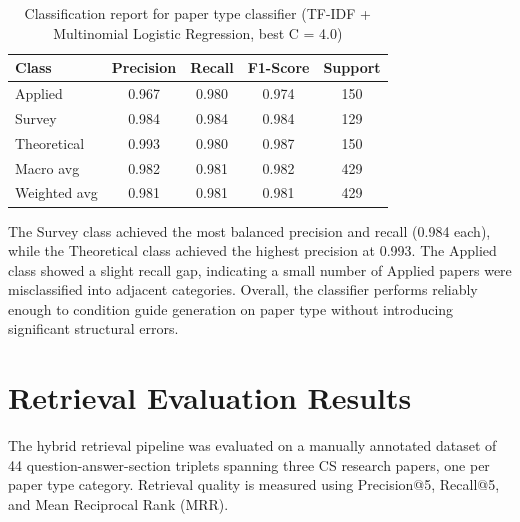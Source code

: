 \documentclass[12pt,a4paper]{report}
\begin{document}
\begin{table}[h]
\centering
\begin{tabular}{lcccc}
\toprule
\textbf{Class} & \textbf{Precision} & \textbf{Recall} & \textbf{F1-Score}
& \textbf{Support} \\
\midrule
Applied      & 0.967 & 0.980 & 0.974 & 150 \\
Survey       & 0.984 & 0.984 & 0.984 & 129 \\
Theoretical  & 0.993 & 0.980 & 0.987 & 150 \\
\midrule
Macro avg    & 0.982 & 0.981 & 0.982 & 429 \\
Weighted avg & 0.981 & 0.981 & 0.981 & 429 \\
\bottomrule
\end{tabular}
\caption{Classification report for paper type classifier
(TF-IDF + Multinomial Logistic Regression, best C = 4.0)}
\label{tab:classifier_results}
\end{table}

The Survey class achieved the most balanced precision and recall (0.984 each),
while the Theoretical class achieved the highest precision at 0.993. The Applied
class showed a slight recall gap, indicating a small number of Applied papers
were misclassified into adjacent categories. Overall, the classifier performs
reliably enough to condition guide generation on paper type without introducing
significant structural errors.

\section{Retrieval Evaluation Results}

The hybrid retrieval pipeline was evaluated on a manually annotated dataset of
44 question-answer-section triplets spanning three CS research papers, one per
paper type category. Retrieval quality is measured using Precision@5, Recall@5,
and Mean Reciprocal Rank (MRR).
\end{document}
